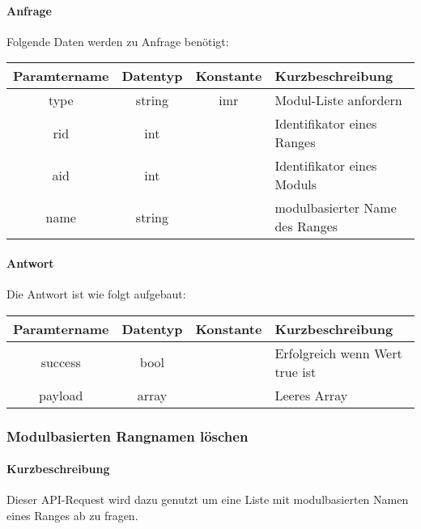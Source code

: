 \paragraph{Anfrage}Folgende Daten werden zu Anfrage benötigt:
\begin{table}[H]
	\begin{tabular}{|c|c|c|p{6.5cm}|}
		\hline
		\textbf{Paramtername} & \textbf{Datentyp} & \textbf{Konstante} & \textbf{Kurzbeschreibung}                                                                                               \\ \hline
		type                & string            & imr                & Modul-Liste anfordern \\ \hline
		rid                 & int               &                    & Identifikator eines Ranges \\ \hline
		aid                 & int               &                    & Identifikator eines Moduls \\ \hline
		name                & string            &                    & modulbasierter Name des Ranges  \\ \hline
	\end{tabular}
\end{table}
\paragraph{Antwort}Die Antwort ist wie folgt aufgebaut:
\begin{table}[H]
	\begin{tabular}{|c|c|c|p{6.5cm}|}
		\hline
		\textbf{Paramtername} & \textbf{Datentyp} & \textbf{Konstante} & \textbf{Kurzbeschreibung}            \\ \hline                
		success             & bool             &                 & Erfolgreich wenn Wert {\glqq true\grqq} ist \\ \hline
		payload             & array            &                 & Leeres Array \\ \hline
	\end{tabular}
\end{table}
\subsubsection{Modulbasierten Rangnamen löschen}
\paragraph{Kurzbeschreibung}Dieser API-Request wird dazu genutzt um eine Liste mit modulbasierten Namen eines Ranges ab zu fragen.
